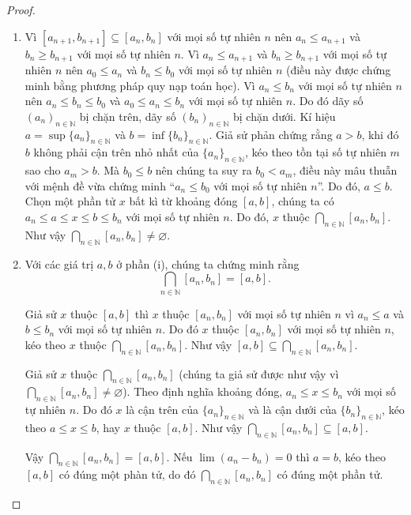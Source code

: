 \begin{proof}
    \begin{enumerate}[label={(\roman*)}]
        \item Vì $[a_{n+1}, b_{n+1}]\subseteq [a_{n}, b_{n}]$ với mọi số tự nhiên $n$ nên $a_{n}\leq a_{n+1}$ và $b_{n}\geq b_{n+1}$ với mọi số tự nhiên $n$. Vì $a_{n}\leq a_{n+1}$ và $b_{n}\geq b_{n+1}$ với mọi số tự nhiên $n$ nên $a_{0}\leq a_{n}$ và $b_{n}\leq b_{0}$ với mọi số tự nhiên $n$ (điều này được chứng minh bằng phương pháp quy nạp toán học). Vì $a_{n}\leq b_{n}$ với mọi số tự nhiên $n$ nên $a_{n}\leq b_{n}\leq b_{0}$ và $a_{0}\leq a_{n}\leq b_{n}$ với mọi số tự nhiên $n$. Do đó dãy số ${(a_{n})}_{n\in\mathbb{N}}$ bị chặn trên, dãy số ${(b_{n})}_{n\in\mathbb{N}}$ bị chặn dưới. Kí hiệu $a = \sup {\{ a_{n}\}}_{n\in\mathbb{N}}$ và $b = \inf {\{ b_{n} \}}_{n\in\mathbb{N}}$. Giả sử phản chứng rằng $a > b$, khi đó $b$ không phải cận trên nhỏ nhất của ${\{ a_{n} \}}_{n\in\mathbb{N}}$, kéo theo tồn tại số tự nhiên $m$ sao cho $a_{m} > b$. Mà $b_{0}\leq b$ nên chúng ta suy ra $b_{0} < a_{m}$, điều này mâu thuẫn với mệnh đề vừa chứng minh ``$a_{n}\leq b_{0}$ với mọi số tự nhiên $n$''. Do đó, $a\leq b$. Chọn một phần tử $x$ bất kì từ khoảng đóng $[a, b]$, chúng ta có $a_{n}\leq a\leq x\leq b\leq b_{n}$ với mọi số tự nhiên $n$. Do đó, $x$ thuộc $\bigcap_{n\in\mathbb{N}} [a_{n}, b_{n}]$. Như vậy $\bigcap_{n\in\mathbb{N}} [a_{n}, b_{n}]\ne\varnothing$.
        \item Với các giá trị $a, b$ ở phần (i), chúng ta chứng minh rằng
              \[
                  \bigcap_{n\in\mathbb{N}} [a_{n}, b_{n}] = [a, b].
              \]

              Giả sử $x$ thuộc $[a, b]$ thì $x$ thuộc $[a_{n}, b_{n}]$ với mọi số tự nhiên $n$ vì $a_{n}\leq a$ và $b\leq b_{n}$ với mọi số tự nhiên $n$. Do đó $x$ thuộc $[a_{n}, b_{n}]$ với mọi số tự nhiên $n$, kéo theo $x$ thuộc $\bigcap_{n\in\mathbb{N}} [a_{n}, b_{n}]$. Như vậy $[a, b]\subseteq \bigcap_{n\in\mathbb{N}} [a_{n}, b_{n}]$.

              Giả sử $x$ thuộc $\bigcap_{n\in\mathbb{N}} [a_{n}, b_{n}]$ (chúng ta giả sử được như vậy vì $\bigcap_{n\in\mathbb{N}} [a_{n}, b_{n}]\ne \varnothing$). Theo định nghĩa khoảng đóng, $a_{n}\leq x\leq b_{n}$ với mọi số tự nhiên $n$. Do đó $x$ là cận trên của ${\{a_{n}\}}_{n\in\mathbb{N}}$ và là cận dưới của ${\{b_{n}\}}_{n\in\mathbb{N}}$, kéo theo $a\leq x\leq b$, hay $x$ thuộc $[a, b]$. Như vậy $\bigcap_{n\in\mathbb{N}} [a_{n}, b_{n}]\subseteq [a, b]$.

              Vậy $\bigcap_{n\in\mathbb{N}} [a_{n}, b_{n}] = [a, b]$. Nếu $\lim (a_{n} - b_{n}) = 0$ thì $a = b$, kéo theo $[a, b]$ có đúng một phàn tử, do đó $\bigcap_{n\in\mathbb{N}} [a_{n}, b_{n}]$ có đúng một phần tử.
    \end{enumerate}
\end{proof}

